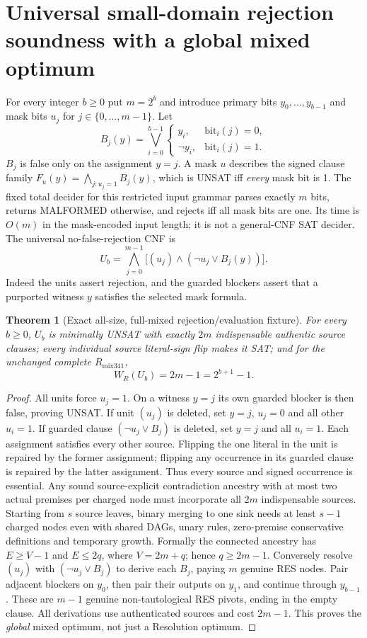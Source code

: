 \documentclass[11pt]{article}
\newtheorem{theorem}{Theorem}
\begin{document}
\section*{Universal small-domain rejection soundness with a global mixed optimum}
For every integer $b\ge0$ put $m=2^b$ and introduce primary bits $y_0,\ldots,y_{b-1}$ and mask bits $u_j$ for $j\in\{0,\ldots,m-1\}$. Let
\[
 B_j(y)=\bigvee_{i=0}^{b-1}
 \begin{cases}y_i,&\text{bit}_i(j)=0,\\
                \neg y_i,&\text{bit}_i(j)=1.\end{cases}
\]
$B_j$ is false only on the assignment $y=j$. A mask $u$ describes the signed clause family $F_u(y)=\bigwedge_{j:u_j=1} B_j(y)$, which is UNSAT iff \emph{every} mask bit is 1. The fixed total decider for this restricted input grammar parses exactly $m$ bits, returns MALFORMED otherwise, and rejects iff all mask bits are one. Its time is $O(m)$ in the mask-encoded input length; it is not a general-CNF SAT decider. The universal no-false-rejection CNF is
\[
 U_b=\bigwedge_{j=0}^{m-1}
 \bigl[(u_j)\wedge(\neg u_j\vee B_j(y))\bigr].
 \tag{1}
\]
Indeed the units assert rejection, and the guarded blockers assert that a purported witness $y$ satisfies the selected mask formula.

\begin{theorem}[Exact all-size, full-mixed rejection/evaluation fixture]
For every $b\ge0$, $U_b$ is minimally UNSAT with exactly $2m$ indispensable authentic source clauses; every individual source literal-sign flip makes it SAT; and for the \emph{unchanged complete} $R_{\mathrm{mix341}}$,
\[
 \boxed{W_R(U_b)=2m-1=2^{b+1}-1.}\tag{2}
\]
\end{theorem}
\begin{proof}
All units force $u_j=1$. On a witness $y=j$ its own guarded blocker is then false, proving UNSAT. If unit $(u_j)$ is deleted, set $y=j$, $u_j=0$ and all other $u_i=1$. If guarded clause $(\neg u_j\vee B_j)$ is deleted, set $y=j$ and all $u_i=1$. Each assignment satisfies every other source. Flipping the one literal in the unit is repaired by the former assignment; flipping any occurrence in its guarded clause is repaired by the latter assignment. Thus every source and signed occurrence is essential.
Any sound source-explicit contradiction ancestry with at most two actual premises per charged node must incorporate all $2m$ indispensable sources. Starting from $s$ source leaves, binary merging to one sink needs at least $s-1$ charged nodes even with shared DAGs, unary rules, zero-premise conservative definitions and temporary growth. Formally the connected ancestry has $E\ge V-1$ and $E\le2q$, where $V=2m+q$; hence $q\ge2m-1$.
Conversely resolve $(u_j)$ with $(\neg u_j\vee B_j)$ to derive each $B_j$, paying $m$ genuine RES nodes. Pair adjacent blockers on $y_0$, then pair their outputs on $y_1$, and continue through $y_{b-1}$. These are $m-1$ genuine non-tautological RES pivots, ending in the empty clause. All derivations use authenticated sources and cost $2m-1$. This proves the \emph{global} mixed optimum, not just a Resolution optimum.
\end{proof}
\end{document}
